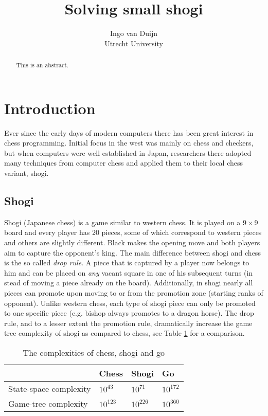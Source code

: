 \documentclass{article}
\title{Solving small shogi}
\author{Ingo van Duijn \\ Utrecht University}
\begin{document}
\maketitle

\begin{abstract}
This is an abstract.
\end{abstract}

\section{Introduction}
Ever since the early days of modern computers there has been great interest in chess programming. Initial
focus in the west was mainly on chess and checkers, but when computers were well established in Japan, researchers there adopted
many techniques from computer chess and applied them to their local chess variant, shogi.

\subsection{Shogi}
Shogi (Japanese chess) is a game similar to western chess. It is played on a $9 \times 9$ board and every
player has 20 pieces, some of which correspond to western pieces and others are slightly different.
Black makes the opening move and both players aim to capture the opponent's king.
The main difference between shogi and chess is the so called \emph{drop rule}.
A piece that is captured by a player now belongs to him and can be placed on \textit{any} vacant square in one of his subsequent turns
(in stead of moving a piece already on the board).
Additionally, in shogi nearly all pieces can promote upon moving to or from the promotion zone (starting ranks of opponent).
Unlike western chess, each type of shogi piece can only be promoted to one specific piece (e.g. bishop always promotes to a dragon horse).
The drop rule, and to a lesser extent the promotion rule, dramatically increase the game tree complexity of shogi as compared to chess, see Table
\ref{table:complex} for a comparison.\\
\begin{table}
\center
\begin{tabular}{l l l l}
 & Chess & Shogi & Go \\ \hline
State-space complexity & $10^{43}$ & $10^{71}$ & $10^{172}$ \\
Game-tree complexity & $10^{123}$ & $10^{226}$ & $10^{360}$ \\ \hline
\end{tabular}
\caption{The complexities of chess, shogi and go}
\label{table:complex}
\end{table}
\end{document}

